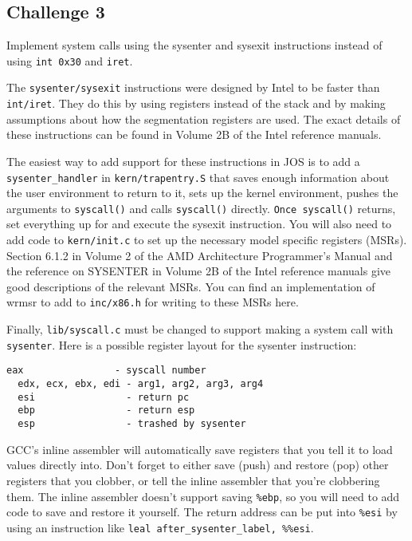 \documentclass[11pt]{article}
\begin{document}
\subsection{Challenge 3}
\begin{framed}
Implement system calls using the sysenter and sysexit instructions instead of using \lstinline|int 0x30| and \lstinline|iret|.

The \lstinline|sysenter/sysexit| instructions were designed by Intel to be faster than \lstinline|int/iret|. They do this by using registers instead of the stack and by making assumptions about how the segmentation registers are used. The exact details of these instructions can be found in Volume 2B of the Intel reference manuals.

The easiest way to add support for these instructions in JOS is to add a \lstinline|sysenter_handler| in \lstinline|kern/trapentry.S| that saves enough information about the user environment to return to it, sets up the kernel environment, pushes the arguments to \lstinline|syscall()| and calls \lstinline|syscall()| directly. \lstinline|Once syscall()| returns, set everything up for and execute the sysexit instruction. You will also need to add code to \lstinline|kern/init.c| to set up the necessary model specific registers (MSRs). Section 6.1.2 in Volume 2 of the AMD Architecture Programmer's Manual and the reference on SYSENTER in Volume 2B of the Intel reference manuals give good descriptions of the relevant MSRs. You can find an implementation of wrmsr to add to \lstinline|inc/x86.h| for writing to these MSRs here.

Finally, \lstinline|lib/syscall.c| must be changed to support making a system call with \lstinline|sysenter|. Here is a possible register layout for the sysenter instruction:

\begin{lstlisting}[aboveskip=-1.5em,frame=none]
  eax                - syscall number
  edx, ecx, ebx, edi - arg1, arg2, arg3, arg4
  esi                - return pc
  ebp                - return esp
  esp                - trashed by sysenter
\end{lstlisting}
  
GCC's inline assembler will automatically save registers that you tell it to load values directly into. Don't forget to either save (push) and restore (pop) other registers that you clobber, or tell the inline assembler that you're clobbering them. The inline assembler doesn't support saving \lstinline|%ebp|, so you will need to add code to save and restore it yourself. The return address can be put into \lstinline|%esi| by using an instruction like \lstinline|leal after_sysenter_label, %%esi|.


\end{framed}
\end{document}
